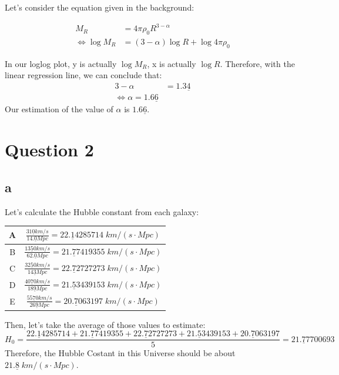 \documentclass[11pt]{article}
\begin{document}
Let's consider the equation given in the background:

$$
\begin{aligned}
    M_R &= 4 \pi \rho_0 R^{3-\alpha} \\
    \iff \log M_R &= (3-\alpha) \log R + \log 4\pi\rho_0
\end{aligned}
$$

In our loglog plot, y is actually $\log M_R$, x is actually $\log R$.
Therefore, with the linear regression line, we can conclude that:
$$
\begin{aligned}
    3-\alpha &= 1.3\underline{4} \\
    \iff \alpha = 1.6\underline{6}
\end{aligned}
$$
Our estimation of the value of $\alpha$ is $1.6\underline{6}$.

\section*{Question 2}

\subsection*{a}
Let's calculate the Hubble constant from each galaxy:
\begin{table}[H]
\huge
\begin{center}
\begin{tabular}{ |c|c| } 
 \hline
 A & $\frac{31\underline{0} km/s}{14.\underline{0} Mpc}
    = 22.\underline{1}4285714 \; km/(s \cdot Mpc)$\\  
 \hline
 B & $\frac{13\underline{5}0 km/s}{62.\underline{0} Mpc}
    = 21.\underline{7}7419355 \; km/(s \cdot Mpc)$\\ 
 \hline
 C & $\frac{32\underline{5}0 km/s}{14\underline{3} Mpc}
    = 22.\underline{7}2727273 \; km/(s \cdot Mpc)$\\ 
 \hline
 D & $\frac{40\underline{7}0 km/s}{18\underline{9} Mpc}
    = 21.\underline{5}3439153 \; km/(s \cdot Mpc)$\\ 
 \hline
 E & $\frac{55\underline{7}0 km/s}{26\underline{9} Mpc}
    = 20.\underline{7}063197 \; km/(s \cdot Mpc)$\\ 
 \hline
\end{tabular}
\end{center}
\end{table}
Then, let's take the average of those values to estimate:
$$
H_0 = 
 \frac{22.\underline{1}4285714 +
 21.\underline{7}7419355 +
 22.\underline{7}2727273 +
 21.\underline{5}3439153 +
 20.\underline{7}063197} {5}
 = 21.\underline{7}7700693
$$
Therefore, the Hubble Costant in this Universe should be about $21.\underline{8} \; km/(s \cdot Mpc)$.
\end{document}
